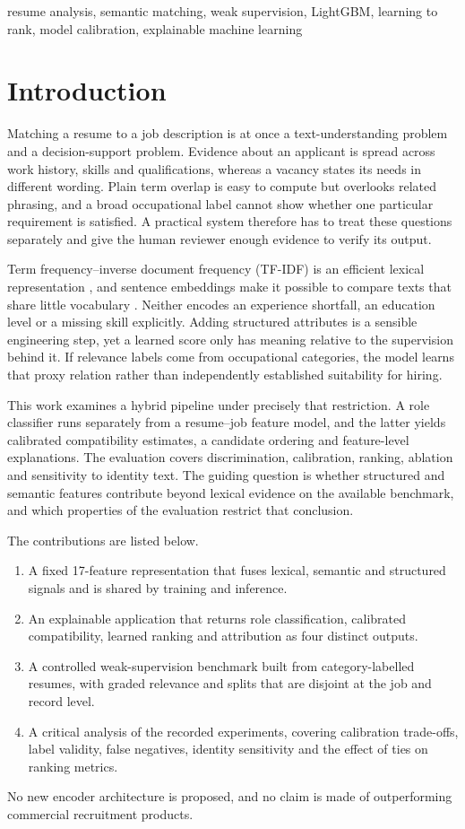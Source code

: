 \documentclass[conference]{IEEEtran}
\begin{document}
\begin{IEEEkeywords}
resume analysis, semantic matching, weak supervision, LightGBM, learning to rank, model calibration, explainable machine learning
\end{IEEEkeywords}

\section{Introduction}
Matching a resume to a job description is at once a text-understanding problem and a decision-support problem. Evidence about an applicant is spread across work history, skills and qualifications, whereas a vacancy states its needs in different wording. Plain term overlap is easy to compute but overlooks related phrasing, and a broad occupational label cannot show whether one particular requirement is satisfied. A practical system therefore has to treat these questions separately and give the human reviewer enough evidence to verify its output.

Term frequency--inverse document frequency (TF-IDF) is an efficient lexical representation \cite{b1}, and sentence embeddings make it possible to compare texts that share little vocabulary \cite{b2}. Neither encodes an experience shortfall, an education level or a missing skill explicitly. Adding structured attributes is a sensible engineering step, yet a learned score only has meaning relative to the supervision behind it. If relevance labels come from occupational categories, the model learns that proxy relation rather than independently established suitability for hiring.

This work examines a hybrid pipeline under precisely that restriction. A role classifier runs separately from a resume--job feature model, and the latter yields calibrated compatibility estimates, a candidate ordering and feature-level explanations. The evaluation covers discrimination, calibration, ranking, ablation and sensitivity to identity text. The guiding question is whether structured and semantic features contribute beyond lexical evidence on the available benchmark, and which properties of the evaluation restrict that conclusion.

The contributions are listed below.
\begin{enumerate}
\item A fixed 17-feature representation that fuses lexical, semantic and structured signals and is shared by training and inference.
\item An explainable application that returns role classification, calibrated compatibility, learned ranking and attribution as four distinct outputs.
\item A controlled weak-supervision benchmark built from category-labelled resumes, with graded relevance and splits that are disjoint at the job and record level.
\item A critical analysis of the recorded experiments, covering calibration trade-offs, label validity, false negatives, identity sensitivity and the effect of ties on ranking metrics.
\end{enumerate}
No new encoder architecture is proposed, and no claim is made of outperforming commercial recruitment products.
\end{document}
